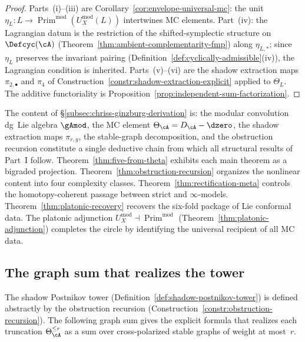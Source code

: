 \begin{proof}
Parts~(i)--(iii) are
Corollary~\ref{cor:envelope-universal-mc}: the unit
$\eta_L \colon L \to
\operatorname{Prim}^{\mathrm{mod}}(U^{\mathrm{mod}}_X(L))$
intertwines MC elements.  Part~(iv): the Lagrangian
datum is the restriction of the shifted-symplectic
structure on
$\Defcyc(\cA)$
(Theorem~\ref{thm:ambient-complementarity-fmp})
along $\eta_{L,*}$; since $\eta_L$ preserves the
invariant pairing
(Definition~\ref{def:cyclically-admissible}(iv)),
the Lagrangian condition is inherited.
Parts~(v)--(vi) are the shadow extraction maps
$\pi_{2,\bullet}$ and $\pi_4$ of
Construction~\ref{constr:shadow-extraction-explicit}
applied to $\Theta_L$.
The additive functoriality is
Proposition~\ref{prop:independent-sum-factorization}.
\end{proof}

\begin{remark}
\label{rem:chriss-ginzburg-synthesis}
The content of
\S\ref{subsec:chriss-ginzburg-derivation} is:
the modular convolution dg~Lie algebra
$\gAmod$, the MC element
$\Theta_\cA = D_\cA - \dzero$, the shadow extraction
maps $\pi_{r,g}$, the stable-graph decomposition,
and the obstruction recursion constitute a single
deductive chain from which all structural results of
Part~I follow.
Theorem~\ref{thm:five-from-theta} exhibits each main
theorem as a bigraded projection.
Theorem~\ref{thm:obstruction-recursion} organizes the
nonlinear content into four complexity classes.
Theorem~\ref{thm:rectification-meta} controls the
homotopy-coherent passage between strict and $\infty$-models.
Theorem~\ref{thm:platonic-recovery} recovers the
six-fold package of Lie conformal data.
The platonic adjunction
$U^{\mathrm{mod}}_X \dashv
\operatorname{Prim}^{\mathrm{mod}}$
(Theorem~\ref{thm:platonic-adjunction})
completes the circle by identifying the universal
recipient of all MC data.
\end{remark}


\subsection{The graph sum that realizes the tower}
\label{subsec:modular-bar-hamiltonian}

The shadow Postnikov tower
(Definition~\ref{def:shadow-postnikov-tower}) is defined
abstractly by the obstruction recursion
(Construction~\ref{constr:obstruction-recursion}).
The following graph sum gives the explicit formula that realizes
each truncation $\Theta_\cA^{\leq r}$ as a sum over
cross-polarized stable graphs of weight at most~$r$.

